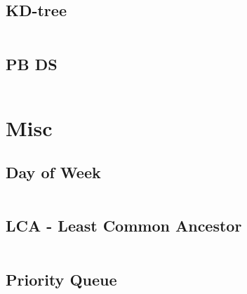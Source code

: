 \documentclass[a4paper]{article}
\begin{document}
  \subsection{KD-tree}
  \inputminted{cpp}{src/ds_KDTree.cpp}
  
  \subsection{PB DS}
  \inputminted{cpp}{src/ds_pbds.cpp}

  \section{Misc}


  \subsection{Day of Week}
  \inputminted{cpp}{src/what-day-is-today.cpp}
  
  \subsection{LCA - Least Common Ancestor}
  \inputminted{cpp}{src/least-common-ancestor.cpp}

  \subsection{Priority Queue}
  \inputminted{cpp}{src/priority_queue.cpp}

\end{document}
